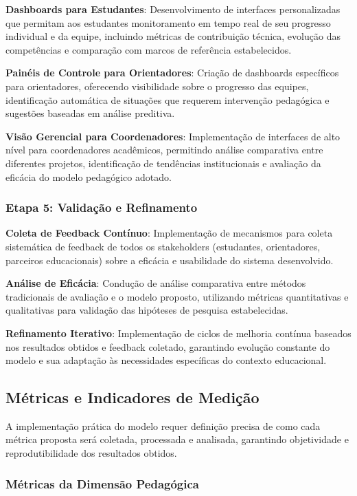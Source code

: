 \documentclass[12pt,a4paper]{article}
\begin{document}
\textbf{Dashboards para Estudantes}: Desenvolvimento de interfaces personalizadas que permitam aos estudantes monitoramento em tempo real de seu progresso individual e da equipe, incluindo métricas de contribuição técnica, evolução das competências e comparação com marcos de referência estabelecidos.

\textbf{Painéis de Controle para Orientadores}: Criação de dashboards específicos para orientadores, oferecendo visibilidade sobre o progresso das equipes, identificação automática de situações que requerem intervenção pedagógica e sugestões baseadas em análise preditiva.

\textbf{Visão Gerencial para Coordenadores}: Implementação de interfaces de alto nível para coordenadores acadêmicos, permitindo análise comparativa entre diferentes projetos, identificação de tendências institucionais e avaliação da eficácia do modelo pedagógico adotado.

\subsubsection{Etapa 5: Validação e Refinamento}

\textbf{Coleta de Feedback Contínuo}: Implementação de mecanismos para coleta sistemática de feedback de todos os stakeholders (estudantes, orientadores, parceiros educacionais) sobre a eficácia e usabilidade do sistema desenvolvido.

\textbf{Análise de Eficácia}: Condução de análise comparativa entre métodos tradicionais de avaliação e o modelo proposto, utilizando métricas quantitativas e qualitativas para validação das hipóteses de pesquisa estabelecidas.

\textbf{Refinamento Iterativo}: Implementação de ciclos de melhoria contínua baseados nos resultados obtidos e feedback coletado, garantindo evolução constante do modelo e sua adaptação às necessidades específicas do contexto educacional.

\subsection{Métricas e Indicadores de Medição}

A implementação prática do modelo requer definição precisa de como cada métrica proposta será coletada, processada e analisada, garantindo objetividade e reprodutibilidade dos resultados obtidos.

\subsubsection{Métricas da Dimensão Pedagógica}
\end{document}

